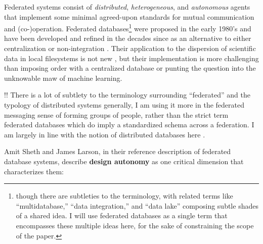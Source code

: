 \documentclass[notoc]{tufte-book}
\begin{document}
Federated systems consist of \emph{distributed}, \emph{heterogeneous},
and \emph{autonomous} agents that implement some minimal agreed-upon
standards for mutual communication and (co-)operation. Federated
databases\footnote{though there are subtleties to the terminology, with
  related terms like ``multidatabase,'' ``data integration,'' and ``data
  lake'' composing subtle shades of a shared idea. I will use federated
  databases as a single term that encompasses these multiple ideas here,
  for the sake of constraining the scope of the paper.} were proposed in
the early 1980's \citep{heimbignerFederatedArchitectureInformation1985}  and have been
developed and refined in the decades since as an alternative to either
centralization or non-integration \citep{litwinInteroperabilityMultipleAutonomous1990, kashyapSemanticSchematicSimilarities1996, hullManagingSemanticHeterogeneity1997} . Their application to the
dispersion of scientific data in local filesystems is not new \citep{busseFederatedInformationSystems1999, djokic-petrovicPIBASFedSPARQLWebbased2017, hasnainBioFedFederatedQuery2017} , but their implementation is more
challenging than imposing order with a centralized database or punting
the question into the unknowable maw of machine learning.

!! There is a lot of subtlety to the terminology surrounding
``federated'' and the typology of distributed systems generally, I am
using it more in the federated messaging sense of forming groups of
people, rather than the strict term federated databases which do imply a
standardized schema across a federation. I am largely in line with the
notion of distributed databases here \citep{hankeDefenseDecentralizedResearch2021} .

Amit Sheth and James Larson, in their reference description of federated
database systems, describe \textbf{design autonomy} as one critical
dimension that characterizes them:
\end{document}
